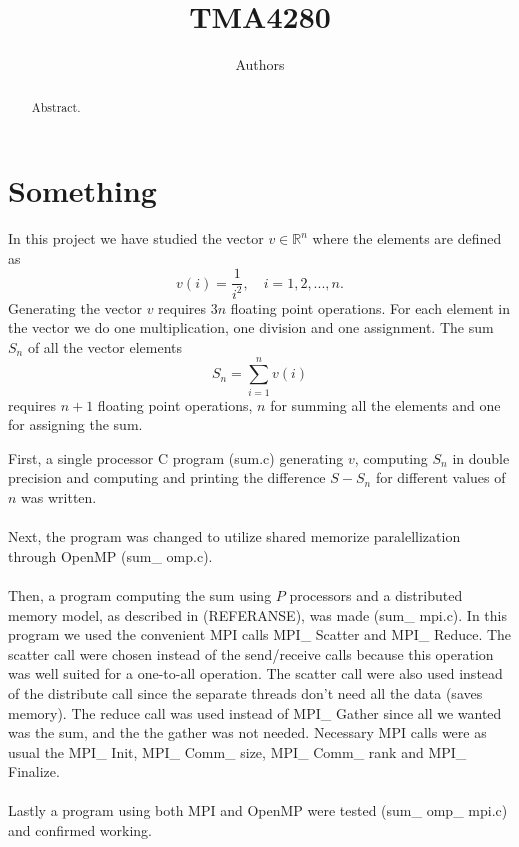 \documentclass{article}
\title{TMA4280}
\author{Authors}
\begin{document}
\maketitle

\begin{abstract}
Abstract. 
\end{abstract}

\newpage
\section*{Something}
In this project we have studied the vector $v \in \mathbb{R}^n$ where the elements are defined as 
\begin{equation}
\label{vdefinition}
	v(i) =\frac{1}{i^2},\quad i = 1,2,...,n.
\end{equation}
Generating the vector $v$ requires $3n$ floating point operations. For each element in the vector we do one multiplication, one division and one assignment.  
The sum $S_n$ of all the vector elements 
\begin{equation}
\label{Sdefinition}
	S_n = \sum_{i=1}^n v(i)
\end{equation}
requires $n+1$ floating point operations, $n$ for summing all the elements and one for assigning the sum.

First, a single processor C program (sum.c) generating $v$, computing $S_n$ in double precision and computing and printing the difference $S - S_n$ for different values of $n$ was written. 
\\\\
Next, the program was changed to utilize shared memorize paralellization through OpenMP (sum\_ omp.c). 
\\\\
Then, a program computing the sum using $P$ processors and a distributed memory model, as described in (REFERANSE), was made (sum\_ mpi.c). In this program we used the convenient MPI calls MPI\_ Scatter and MPI\_ Reduce. The scatter call were chosen instead of the send/receive calls because this operation was well suited for a one-to-all operation. The scatter call were also used instead of the distribute call since the separate threads don't need all the data (saves memory). The reduce call was used instead of MPI\_ Gather since all we wanted was the sum, and the the gather was not needed. Necessary MPI calls were as usual the MPI\_ Init, MPI\_ Comm\_ size, MPI\_ Comm\_ rank and MPI\_ Finalize.
\\\\
Lastly a program using both MPI and OpenMP were tested (sum\_ omp\_ mpi.c) and confirmed working. 
\end{document}
